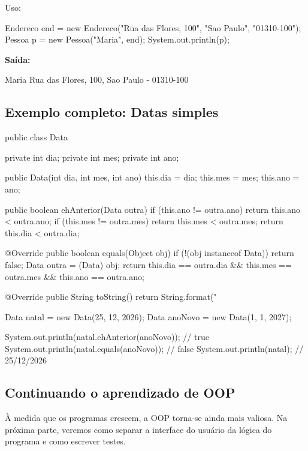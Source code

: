 \documentclass[11pt,a4paper]{article}
\begin{document}
Uso:

\begin{javacode}
Endereco end = new Endereco("Rua das Flores, 100", "Sao Paulo", "01310-100");
Pessoa p = new Pessoa("Maria", end);
System.out.println(p);
\end{javacode}

\textbf{Saída:}
\begin{javacode}
Maria
  Rua das Flores, 100, Sao Paulo - 01310-100
\end{javacode}

\subsection{Exemplo completo: Datas simples}

\begin{javacode}
public class Data {
    private int dia;
    private int mes;
    private int ano;

    public Data(int dia, int mes, int ano) {
        this.dia = dia;
        this.mes = mes;
        this.ano = ano;
    }

    public boolean ehAnterior(Data outra) {
        if (this.ano != outra.ano) return this.ano < outra.ano;
        if (this.mes != outra.mes) return this.mes < outra.mes;
        return this.dia < outra.dia;
    }

    @Override
    public boolean equals(Object obj) {
        if (!(obj instanceof Data)) return false;
        Data outra = (Data) obj;
        return this.dia == outra.dia && this.mes == outra.mes && this.ano == outra.ano;
    }

    @Override
    public String toString() {
        return String.format("%
    }
}
\end{javacode}

\begin{javacode}
Data natal = new Data(25, 12, 2026);
Data anoNovo = new Data(1, 1, 2027);

System.out.println(natal.ehAnterior(anoNovo)); // true
System.out.println(natal.equals(anoNovo));      // false
System.out.println(natal);                      // 25/12/2026
\end{javacode}

\subsection{Continuando o aprendizado de OOP}

À medida que os programas crescem, a OOP torna-se ainda mais valiosa. Na próxima parte, veremos como separar a interface do usuário da lógica do programa e como escrever testes.
\end{document}
